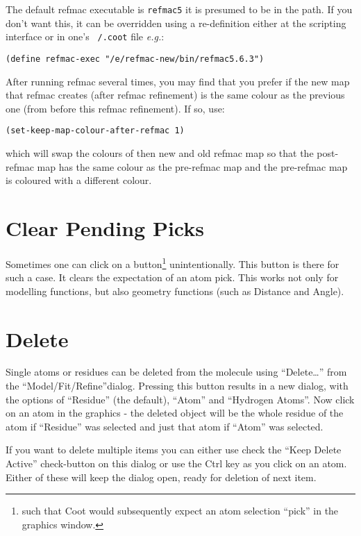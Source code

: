 \documentclass{book}
\begin{document}
The default refmac executable is \texttt{refmac5} it is presumed to be in the
path.  If you don't want this, it can be overridden using a
re-definition either at the scripting interface or in one's
\texttt{~/.coot} file \emph{e.g.}:
\begin{trivlist}
\item \texttt{(define refmac-exec "/e/refmac-new/bin/refmac5.6.3")}
\end{trivlist}

After running refmac several times, you may
find that you prefer if the new map that refmac creates (after refmac
refinement) is the same colour as the previous one (from before this
refmac refinement).  If so, use:

\texttt{(set-keep-map-colour-after-refmac 1)}

which will swap the colours of then new and old refmac map so that the
post-refmac map has the same colour as the pre-refmac map and the
pre-refmac map is coloured with a different colour.


\section{Clear Pending Picks}
Sometimes one can click
on a button\footnote{such that Coot would subsequently expect an atom
  selection ``pick'' in the graphics window.} unintentionally. This
button is there for such a case.  It clears the expectation of an
atom pick.  This works not only for modelling functions, but also
geometry functions (such as Distance and Angle).

\section{Delete}
 Single atoms or residues can be deleted from the
molecule using ``Delete\ldots'' from the ``Model/Fit/Refine''dialog.
Pressing this button results in a new dialog, with the options of
``Residue'' (the default), ``Atom'' and ``Hydrogen Atoms''.  Now click
on an atom in the graphics - the deleted object will be the whole
residue of the atom if ``Residue'' was selected and just that atom if
``Atom'' was selected.

If you want to delete multiple items you can either use check the
``Keep Delete Active'' check-button on this dialog or use the Ctrl key
as you click on an atom.  Either of these will keep the dialog open,
ready for deletion of next item.
\end{document}
